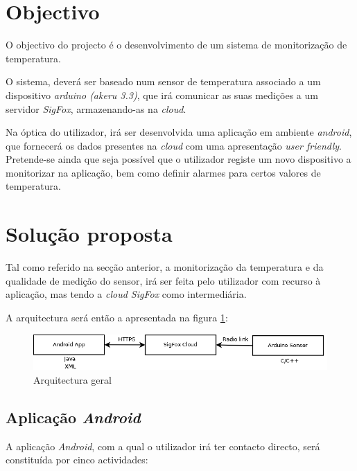 \documentclass[a4paper]{article}
\begin{document}


\section*{Objectivo}

O objectivo do projecto é o desenvolvimento de um sistema de monitorização de temperatura. 

O sistema, deverá ser baseado num sensor de temperatura associado a um dispositivo \textit{arduino (akeru 3.3)}, que irá comunicar as suas medições a um servidor \textit{SigFox}, armazenando-as na \textit{cloud}.

Na óptica do utilizador, irá ser desenvolvida uma aplicação em ambiente \textit{android}, que fornecerá os dados presentes na \textit{cloud} com uma apresentação \textit{user friendly}. Pretende-se ainda que seja possível que o utilizador registe um novo dispositivo a monitorizar na aplicação, bem como definir alarmes para certos valores de temperatura.

\section*{Solução proposta}

Tal como referido na secção anterior, a monitorização da temperatura e da qualidade de medição do sensor, irá ser feita pelo utilizador com recurso à aplicação, mas tendo a \textit{cloud SigFox} como intermediária.

A arquitectura será então a apresentada na figura \ref{fig:general}:
\vspace{5mm}

\begin{figure}[hb]
  \centering
  \includegraphics[scale=0.30]{general.png}
  \caption{Arquitectura geral}
  \label{fig:general}
\end{figure}

\subsection*{Aplicação \textit{Android}}

A aplicação \textit{Android}, com a qual o utilizador irá ter contacto directo, será constituída por cinco actividades:
\end{document}
